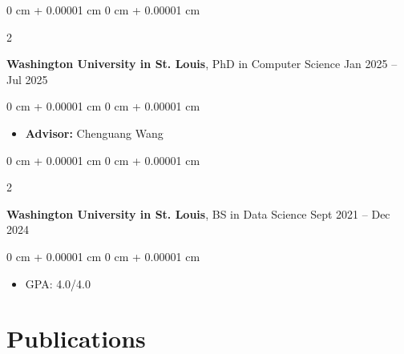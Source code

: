 \documentclass[10pt, letterpaper]{article}
\newenvironment{highlights}{
    \begin{itemize}[
        topsep=0.10 cm,
        parsep=0.10 cm,
        partopsep=0pt,
        itemsep=0pt,
        leftmargin=0 cm + 10pt
    ]
}{
    \end{itemize}
} %
\newenvironment{onecolentry}{
    \begin{adjustwidth}{
        0 cm + 0.00001 cm
    }{
        0 cm + 0.00001 cm
    }
}{
    \end{adjustwidth}
} %
\newenvironment{twocolentry}[2][]{
    \onecolentry
    \def\secondColumn{#2}
    \setcolumnwidth{\fill, 4.5 cm}
    \begin{paracol}{2}
}{
    \switchcolumn \raggedleft \secondColumn
    \end{paracol}
    \endonecolentry
} %
\begin{document}
        \begin{twocolentry}{Jan 2025 -- Jul 2025}
            \textbf{Washington University in St. Louis}, PhD in Computer Science\end{twocolentry}

        \vspace{0.10 cm}
        \begin{onecolentry}
            \begin{highlights}
                \item \textbf{Advisor:} Chenguang Wang
            \end{highlights}
        \end{onecolentry}

        \begin{twocolentry}{Sept 2021 -- Dec 2024}
            \textbf{Washington University in St. Louis}, BS in Data Science\end{twocolentry}

        \vspace{0.10 cm}
        \begin{onecolentry}
            \begin{highlights}
                \item GPA: 4.0/4.0
            \end{highlights}
        \end{onecolentry}


    \section{Publications}
\end{document}

